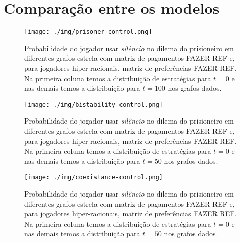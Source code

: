 \chapter{Comparação entre os modelos}

\begin{figure}[h]
    \caption{Probabilidade do jogador usar \textit{silêncio} no dilema do prisioneiro em diferentes grafos estrela com matriz de pagamentos FAZER REF e, para jogadores hiper-racionais, matriz de preferências FAZER REF. Na primeira coluna temos a distribuição de estratégias para $t=0$ e nas demais temos a distribuição para $t=100$ nos grafos dados.}
    \centerline{\texttt{[image: ./img/prisoner-control.png]}}
    \label{fig:prisoner-control.png}
\end{figure}

\begin{figure}[h]
    \caption{Probabilidade do jogador usar \textit{silêncio} no dilema do prisioneiro em diferentes grafos estrela com matriz de pagamentos FAZER REF e, para jogadores hiper-racionais, matriz de preferências FAZER REF. Na primeira coluna temos a distribuição de estratégias para $t=0$ e nas demais temos a distribuição para $t=50$ nos grafos dados.}
    \centerline{\texttt{[image: ./img/bistability-control.png]}}
    \label{fig:bistability-control.png}
\end{figure}

\begin{figure}[h]
    \caption{Probabilidade do jogador usar \textit{silêncio} no dilema do prisioneiro em diferentes grafos estrela com matriz de pagamentos FAZER REF e, para jogadores hiper-racionais, matriz de preferências FAZER REF. Na primeira coluna temos a distribuição de estratégias para $t=0$ e nas demais temos a distribuição para $t=50$ nos grafos dados.}
    \centerline{\texttt{[image: ./img/coexistance-control.png]}}
    \label{fig:coex-control.png}
\end{figure}

